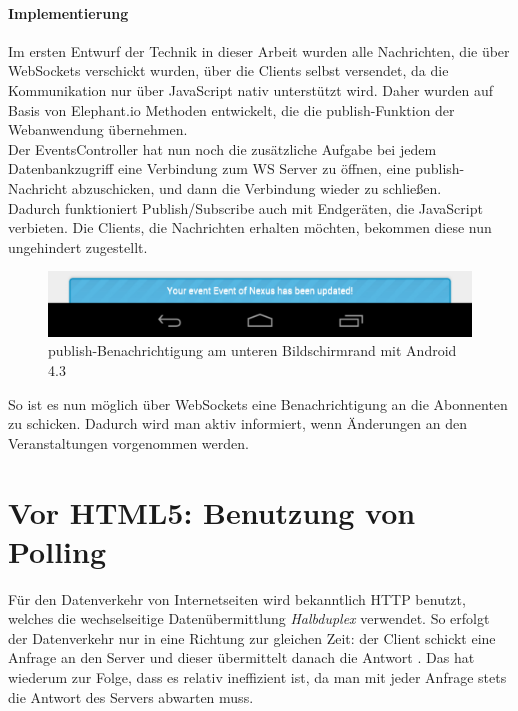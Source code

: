 \paragraph{Implementierung}
Im ersten Entwurf der Technik in dieser Arbeit wurden alle Nachrichten, die über WebSockets verschickt wurden, über die Clients selbst versendet, da die Kommunikation nur über JavaScript nativ unterstützt wird. Daher wurden auf Basis von Elephant.io Methoden entwickelt, die die publish-Funktion der Webanwendung übernehmen.\\
Der EventsController hat nun noch die zusätzliche Aufgabe bei jedem Datenbankzugriff eine Verbindung zum WS Server zu öffnen, eine publish-Nachricht abzuschicken, und dann die Verbindung wieder zu schließen.\\
Dadurch funktioniert Publish/Subscribe auch mit Endgeräten, die JavaScript verbieten. Die Clients, die Nachrichten erhalten möchten, bekommen diese nun ungehindert zugestellt.

\begin{figure}[!ht]
	\centering
	\includegraphics[width=15cm]{fig/noty_android}
	\caption{publish-Benachrichtigung am unteren Bildschirmrand mit Android 4.3}
\end{figure}

So ist es nun möglich über WebSockets eine Benachrichtigung an die Abonnenten zu schicken. Dadurch wird man aktiv informiert, wenn Änderungen an den Veranstaltungen vorgenommen werden. 


\section{Vor HTML5: Benutzung von Polling}
Für den Datenverkehr von Internetseiten wird bekanntlich HTTP benutzt, welches die wechselseitige Datenübermittlung \emph{Halbduplex} verwendet. So erfolgt der Datenverkehr nur in eine Richtung zur gleichen Zeit: der Client schickt eine Anfrage an den Server und dieser übermittelt danach die Antwort \cite[S. 5]{ws}. Das hat wiederum zur Folge, dass es relativ ineffizient ist, da man mit jeder Anfrage stets die Antwort des Servers abwarten muss.

